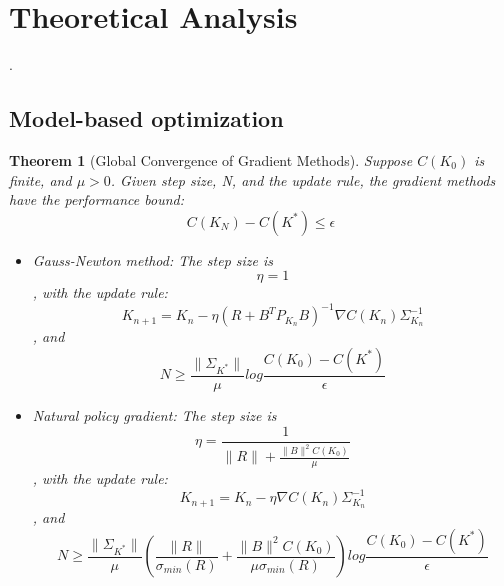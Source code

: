 \section{Theoretical Analysis}.
\newtheorem{theorem}{Theorem}[section]
\newtheorem{corollary}{Corollary}[theorem]
\newtheorem{lemma}[theorem]{Lemma}

\subsection{Model-based optimization}
\begin{theorem}[Global Convergence of Gradient Methods]
Suppose $C(K_0)$ is finite, and $\mu > 0$. Given step size, N, and the update rule, the gradient methods have the performance bound: 
\begin{equation}
    C(K_N)-C(K^*)\leq\epsilon
\end{equation}\newline
\begin{itemize}
\item Gauss-Newton method:\newline
The step size is
\begin{equation}
\eta = 1  
\end{equation}\newline
, with the update rule:
\begin{equation}
K_{n+1}=K_n-\eta(R+B^T P_{K_n}B)^{-1}\nabla C(K_n)\Sigma_{K_n}^{-1}
\end{equation}\newline
, and 
\begin{equation}
N \geq \frac{\|\Sigma_{K^*}\|}{\mu}log
\frac{C(K_0)-C(K^*)}{\epsilon}
\end{equation}\newline
\item Natural policy gradient:\newline
The step size is 
\begin{equation}
\eta = \frac{1}{\|R\|+\frac{\|B\|^2C(K_0)}{\mu}}
\end{equation}\newline
, with the update rule:
\begin{equation}
K_{n+1}=K_n-\eta\nabla C(K_n)\Sigma_{K_n}^{-1}
\end{equation}\newline
, and 
\begin{equation}
N\geq\frac{\|\Sigma_{K^*}\|}{\mu}(\frac{\|R\|}{\sigma_{min}(R)}+\frac{\|B\|^2C(K_0)}{\mu\sigma_{min}(R)})log\frac{C(K_0)-C(K^*)}{\epsilon}
\end{equation}\newline

\end{itemize}
\end{theorem}
